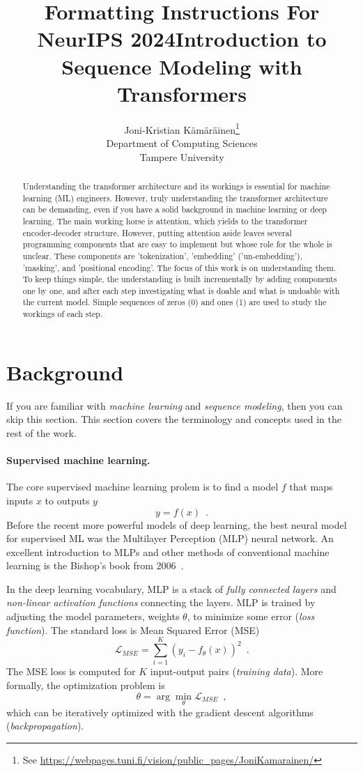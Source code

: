 \documentclass[final]{article}
\title{Formatting Instructions For NeurIPS 2024}
\title{Introduction to Sequence Modeling with Transformers}
\author{%
  Joni-Kristian K{\"a}m{\"a}r{\"a}inen\thanks{See \url{https://webpages.tuni.fi/vision/public_pages/JoniKamarainen/}}\\
  Department of Computing Sciences\\
  Tampere University
}
\begin{document}
\maketitle


\begin{abstract}
  Understanding the transformer architecture and its workings is
  essential for machine learning (ML) engineers. However, truly
  understanding the transformer architecture can be demanding, even if
  you have a solid background in machine learning or deep
  learning. The main working horse is attention, which yields to the
  transformer encoder-decoder structure. However, putting attention
  aside leaves several programming components that are easy to
  implement but whose role for the whole is unclear. These components
  are 'tokenization', 'embedding' ('un-embedding'), 'masking', and
  'positional encoding'. The focus of this work is on understanding
  them. To keep things simple, the understanding is built
  incrementally by adding components one by one, and after each step
  investigating what is doable and what is undoable with the current
  model. Simple sequences of zeros (0) and ones (1) are used to study
  the workings of each step.
\end{abstract}

\section{Background}
If you are familiar with \textit{machine learning} and
\textit{sequence modeling}, then you can skip this section. This
section covers the terminology and concepts used in the rest of the work.

\paragraph{Supervised machine learning.}
The core supervised machine learning prolem is to find a model $f$ that
maps inputs $x$ to outputs $y$
\begin{equation}
  y = f(x) \enspace .
  \label{eq:supervisedML}
\end{equation}
Before the recent more powerful models of deep learning,
the best neural model for supervised ML was the Multilayer Perception
(MLP) neural network. An excellent introduction to MLPs and other
methods of conventional machine learning is the Bishop's book from
2006~\cite{MLBook}.

In the deep learning vocabulary, MLP is a
stack of \textit{fully connected layers} and \textit{non-linear
  activation functions} connecting the layers. MLP is trained by adjusting
the model parameters, weights $\theta$, to minimize some error
(\textit{loss function}). The standard loss is
Mean Squared Error (MSE)
\[
\mathcal{L}_{MSE} = \sum_{i=1}^{K} (y_i-f_\theta (x))^2 \enspace .
\]
The MSE loss is computed for $K$ input-output pairs (\textit{training
  data}). More formally, the optimization
problem is
\[
\theta = \arg\min_{\theta} \mathcal{L}_{MSE} \enspace ,
\]
which can be iteratively optimized with the gradient descent
algorithms (\textit{backpropagation}).
\end{document}
